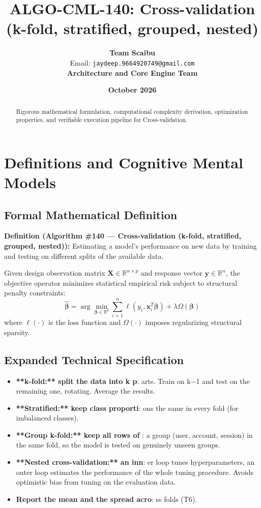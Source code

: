 \documentclass[11pt,a4paper]{article}
\title{\textbf{ALGO-CML-140: Cross-validation (k-fold, stratified, grouped, nested)}}
\author{\textbf{Team Scaibu} \\ \small Email: \texttt{jaydeep.9664920749@gmail.com} \\ \small \textbf{Architecture and Core Engine Team}}
\date{\textbf{October 2026}}
\theoremstyle{definition}
\begin{document}
\maketitle

\begin{abstract}
Rigorous mathematical formulation, computational complexity derivation, optimization properties, and verifiable execution pipeline for Cross-validation.
\end{abstract}

\section{Definitions and Cognitive Mental Models}

\subsection{Formal Mathematical Definition}
\textbf{Definition (Algorithm \#140 --- Cross-validation (k-fold, stratified, grouped, nested)):}
Estimating a model's performance on new data by training and testing on different splits of the available data.

Given design observation matrix $\mathbf{X} \in \mathbb{R}^{n \times p}$ and response vector $\mathbf{y} \in \mathbb{R}^n$, the objective operator minimizes statistical empirical risk subject to structural penalty constraints:
\begin{equation}
\hat{\boldsymbol{\beta}} = \arg\min_{\boldsymbol{\beta} \in \mathbb{R}^p} \sum_{i=1}^n \ell(y_i, \mathbf{x}_i^T \boldsymbol{\beta}) + \lambda \Omega(\boldsymbol{\beta})
\end{equation}
where $\ell(\cdot)$ is the loss function and $\Omega(\cdot)$ imposes regularizing structural sparsity.

\subsection{Expanded Technical Specification}
\begin{itemize}
\item \textbf{**k-fold:** split the data into k p}: arts. Train on k−1 and test on the remaining one, rotating. Average the results.
\item \textbf{**Stratified:** keep class proporti}: ons the same in every fold (for imbalanced classes).
\item \textbf{**Group k-fold:** keep all rows of }: a group (user, account, session) in the same fold, so the model is tested on genuinely unseen groups.
\item \textbf{**Nested cross-validation:** an inn}: er loop tunes hyperparameters, an outer loop estimates the performance of the whole tuning procedure. Avoids optimistic bias from tuning on the evaluation data.
\item \textbf{Report the mean and the spread acro}: ss folds (T6).
\end{itemize}
\end{document}
